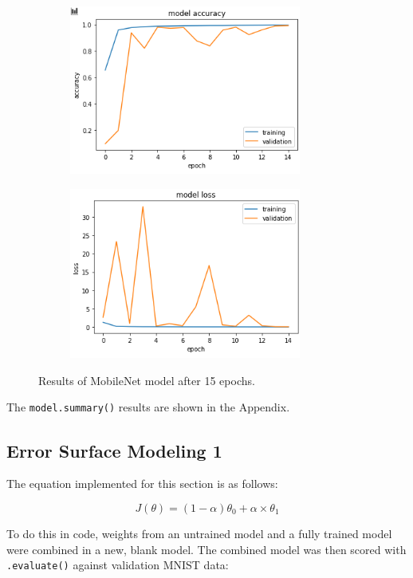 \documentclass{article}
\begin{document}
\begin{figure}[H]
\centering
\begin{subfigure}
  \centering
  \includegraphics[width=3in]{csci-8920/hw-3/images/mnet_15_epoch.png}
  \label{fig:accuracy-15}
\end{subfigure}%
\begin{subfigure}
  \centering
  \includegraphics[width=3in]{csci-8920/hw-3/images/mnet_loss_15.png}
  \label{fig:loss-15}
\end{subfigure}
\caption{Results of MobileNet model after 15 epochs.}
\label{fig:default-15}
\end{figure}

The \lstinline{model.summary()} results are shown in the  Appendix.

\subsection{Error Surface Modeling 1}

The equation implemented for this section is as follows:

\begin{equation}
    J(\theta) = (1-\alpha) \theta_0 + \alpha \times \theta_1
\end{equation}

To do this in code, weights from an untrained model and a fully trained model were combined in a new, blank model.
The combined model was then scored with \lstinline{.evaluate()} against validation MNIST data:
\end{document}
